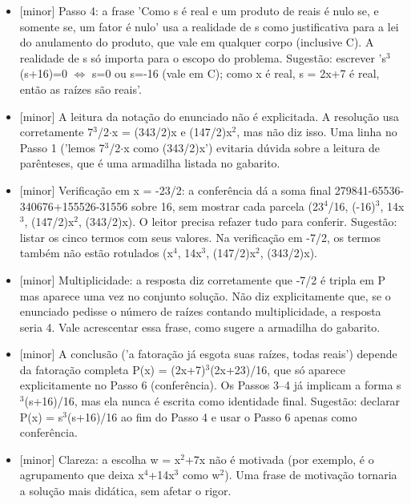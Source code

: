 \documentclass{article}%
\begin{document}
\begin{itemize}%
\item%
{[}minor{]} Passo 4: a frase 'Como s é real e um produto de reais é nulo se, e somente se, um fator é nulo' usa a realidade de s como justificativa para a lei do anulamento do produto, que vale em qualquer corpo (inclusive C). A realidade de s só importa para o escopo do problema. Sugestão: escrever 's$^3$(s+16)=0 $\Leftrightarrow$ s=0 ou s=-16 (vale em C); como x é real, s = 2x+7 é real, então as raízes são reais'.%
\item%
{[}minor{]} A leitura da notação do enunciado não é explicitada. A resolução usa corretamente 7$^3$/2$\cdot$x = (343/2)x e (147/2)x$^2$, mas não diz isso. Uma linha no Passo 1 ('lemos 7$^3$/2$\cdot$x como (343/2)x') evitaria dúvida sobre a leitura de parênteses, que é uma armadilha listada no gabarito.%
\item%
{[}minor{]} Verificação em x = -23/2: a conferência dá a soma final 279841-65536-340676+155526-31556 sobre 16, sem mostrar cada parcela (23$^{4}$/16, (-16)$^3$, 14x$^3$, (147/2)x$^2$, (343/2)x). O leitor precisa refazer tudo para conferir. Sugestão: listar os cinco termos com seus valores. Na verificação em -7/2, os termos também não estão rotulados (x$^{4}$, 14x$^3$, (147/2)x$^2$, (343/2)x).%
\item%
{[}minor{]} Multiplicidade: a resposta diz corretamente que -7/2 é tripla em P mas aparece uma vez no conjunto solução. Não diz explicitamente que, se o enunciado pedisse o número de raízes contando multiplicidade, a resposta seria 4. Vale acrescentar essa frase, como sugere a armadilha do gabarito.%
\item%
{[}minor{]} A conclusão ('a fatoração já esgota suas raízes, todas reais') depende da fatoração completa P(x) = (2x+7)$^3$(2x+23)/16, que só aparece explicitamente no Passo 6 (conferência). Os Passos 3--4 já implicam a forma s$^3$(s+16)/16, mas ela nunca é escrita como identidade final. Sugestão: declarar P(x) = s$^3$(s+16)/16 ao fim do Passo 4 e usar o Passo 6 apenas como conferência.%
\item%
{[}minor{]} Clareza: a escolha w = x$^2$+7x não é motivada (por exemplo, é o agrupamento que deixa x$^{4}$+14x$^3$ como w$^2$). Uma frase de motivação tornaria a solução mais didática, sem afetar o rigor.%
\end{itemize}%
\end{document}
